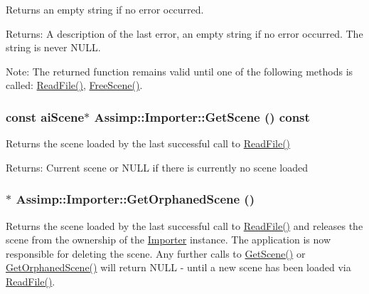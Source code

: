 Returns an empty string if no error occurred. \begin{Desc}
\item[Returns:]A description of the last error, an empty string if no error occurred. The string is never NULL.\end{Desc}
\begin{Desc}
\item[Note:]The returned function remains valid until one of the following methods is called: \hyperlink{class_assimp_1_1_importer_174418ab41d5b8bc51a044895cb991e5}{ReadFile()}, \hyperlink{class_assimp_1_1_importer_53dafc3046abc33365a07c605716c5d4}{FreeScene()}. \end{Desc}
\hypertarget{class_assimp_1_1_importer_26fd479a6a955969c1377fa59f92db66}{
\subsubsection[GetScene]{\setlength{\rightskip}{0pt plus 5cm}const {\bf aiScene}$\ast$ Assimp::Importer::GetScene () const}}
\label{class_assimp_1_1_importer_26fd479a6a955969c1377fa59f92db66}


Returns the scene loaded by the last successful call to \hyperlink{class_assimp_1_1_importer_174418ab41d5b8bc51a044895cb991e5}{ReadFile()}

\begin{Desc}
\item[Returns:]Current scene or NULL if there is currently no scene loaded \end{Desc}
\hypertarget{class_assimp_1_1_importer_60eb9042fb85bfbd61a863e131a56ecd}{
\subsubsection[GetOrphanedScene]{$\ast$ Assimp::Importer::GetOrphanedScene ()}}
\label{class_assimp_1_1_importer_60eb9042fb85bfbd61a863e131a56ecd}


Returns the scene loaded by the last successful call to \hyperlink{class_assimp_1_1_importer_174418ab41d5b8bc51a044895cb991e5}{ReadFile()} and releases the scene from the ownership of the \hyperlink{class_assimp_1_1_importer}{Importer} instance. The application is now responsible for deleting the scene. Any further calls to \hyperlink{class_assimp_1_1_importer_26fd479a6a955969c1377fa59f92db66}{GetScene()} or \hyperlink{class_assimp_1_1_importer_60eb9042fb85bfbd61a863e131a56ecd}{GetOrphanedScene()} will return NULL - until a new scene has been loaded via \hyperlink{class_assimp_1_1_importer_174418ab41d5b8bc51a044895cb991e5}{ReadFile()}.

